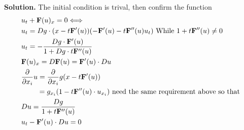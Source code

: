 \documentclass[a4paper]{book}
\newenvironment{solution}%
{\noindent\textbf{Solution.}}%
{\qedhere}
\numberwithin{equation}{chapter}
\theoremstyle{definition}
\begin{document}
\begin{solution}
  The initial condition is trival, then confirm the function
  \begin{align*}
    &u_t + \mathbf{F}(u)_x = 0 \Longleftrightarrow \\
    &u_t = D g \cdot (x - t\mathbf{F}^\prime(u))(- \mathbf{F}^\prime(u) - t \mathbf{F}^{\prime \prime}(u) u_t) \textmd{ While } 1 + t \mathbf{F}^{\prime \prime}(u) \neq 0 \\
    &u_t = - \frac{D g \cdot \mathbf{F}^\prime(u)}{1 + D g \cdot t \mathbf{F}^{\prime \prime}(u)} \\
    &\mathbf{F}(u)_x = D \mathbf{F}(u) = \mathbf{F}^\prime(u) \cdot D u \\
    &\frac{\partial}{\partial x_i} u = \frac{\partial}{\partial x_i} g(x - t \mathbf{F}^\prime (u)) \\
    &\qquad \; = g_{x_i} (1 - t \mathbf{F}^{\prime \prime}(u) \cdot u_{x_i}) \textmd{ need the same requirement above so that } \\
    &D u = \frac{D g}{1 + t \mathbf{F}^{\prime \prime}(u)} \\
    &u_t - \mathbf{F}^\prime(u) \cdot D u = 0
  \end{align*}
\end{solution}








\end{document}
